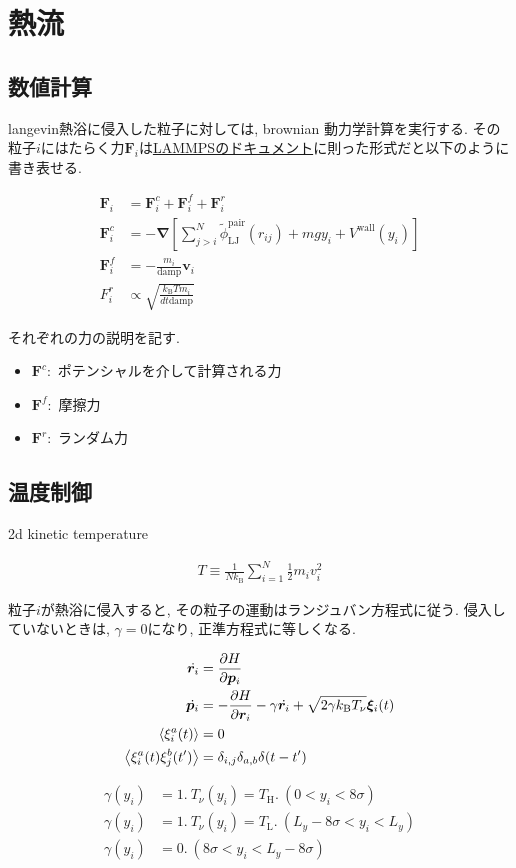 \section{熱流}

\subsection{数値計算}

langevin熱浴に侵入した粒子に対しては, brownian 動力学計算を実行する. その粒子$i$にはたらく力$\bm{F}_i$は\href{https://docs.lammps.org/fix_langevin.html}{LAMMPSのドキュメント}に則った形式だと以下のように書き表せる.

\begin{align}
  \bm{F}_i &= \bm{F}_i^c + \bm{F}_i^f + \bm{F}_i^r \\
  \bm{F}_i^c &= - \bm{\nabla} 
  \left[
    \sum_{j > i}^{N}
        \tilde{\phi}_{\text{LJ}}^{\text{pair}}(r_{ij})
      + mgy_i +V^{\text{wall}}(y_i)
  \right] \\
  \bm{F}_i^f &= -\frac{m_i}{\text{damp}}\bm{v}_i \\
  F_i^r &\propto \sqrt{\frac{k_\text{B} Tm_i}{dt \text{damp}}}
\end{align}

それぞれの力の説明を記す.

\begin{itemize}
  \item $\bm{F}^c \colon$ ポテンシャルを介して計算される力
  \item $\bm{F}^f \colon$ 摩擦力
  \item $\bm{F}^r \colon$ ランダム力
\end{itemize}


\subsection{温度制御}


2d kinetic temperature

\begin{align}
  T \equiv \frac{1}{Nk_{\text{B}}}\sum_{i=1}^{N} \frac{1}{2}m_i v_{i}^2
\end{align}

粒子$i$が熱浴に侵入すると, その粒子の運動はランジュバン方程式に従う. 侵入していないときは, $\gamma = 0$になり, 正準方程式に等しくなる.

\begin{align}
  \dot{\bm{r}_i} &= \pdv{H}{\bm{p}_i} \\
  \dot{\bm{p}_i} &= - \pdv{H}{\bm{r}_i} - \gamma \dot{\bm{r}_i} + \sqrt{2 \gamma k_{\text{B}}T_{\nu}}\bm{\xi}_i (t) \\
  \expval{\xi_{i}^{a}(t)} &= 0 \\
  \expval{\xi_{i}^{a}(t)\xi_{j}^{b}(t')} &= \delta_{i,j} \delta_{a,b}\delta (t-t')
\end{align}

\begin{align}
  \gamma(y_i) &= 1. \ T_{\nu}(y_i) = T_{\text{H}}. \ (0 < y_i < 8\sigma) \\
  \gamma(y_i) &= 1. \ T_{\nu}(y_i) = T_{\text{L}}. \ (L_y - 8\sigma < y_i < L_y) \\
  \gamma(y_i) &= 0.  \ (8\sigma < y_i < L_y - 8\sigma)
\end{align}
